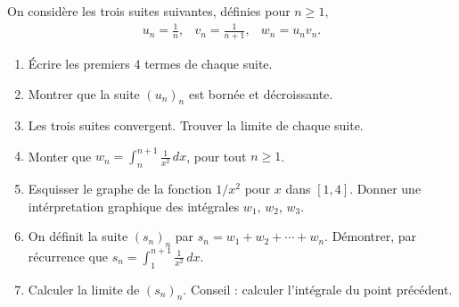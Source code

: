 \begin{exercice}
  
On considère les trois suites suivantes, définies pour $n\geq 1$, 
\begin{equation}\nonumber
  \begin{array}{ccc}
   \displaystyle  u_n=\frac{1}{n}, &\displaystyle  v_n=\frac{1}{n+1}, & \displaystyle w_n=u_nv_n.
  \end{array}
\end{equation}
\begin{enumerate}
\item Écrire les premiers 4 termes de chaque suite.
\item Montrer que la suite $(u_n)_n$ est bornée et décroissante.  
\item Les trois suites convergent. Trouver la limite de chaque suite.
\item Monter que $\displaystyle w_n=\int_{n}^{n+1}\frac{1}{x^2}\, dx$, pour tout $n\geq 1$.
\item Esquisser le graphe de la fonction $1/x^2$ pour $x$ dans $[1,4]$. Donner une intérpretation graphique des intégrales  $w_1$, $w_2$, $w_3$. 
\item On définit la suite $(s_n)_n$ par $s_n= w_1+w_2+\cdots+ w_n$. Démontrer, par récurrence que $s_n=\int_{1}^{n+1}\frac{1}{x^2}\,dx$.
\item Calculer la limite de $(s_n)_n$. Conseil : calculer l'intégrale du point précédent.  
\end{enumerate}
\end{exercice}
